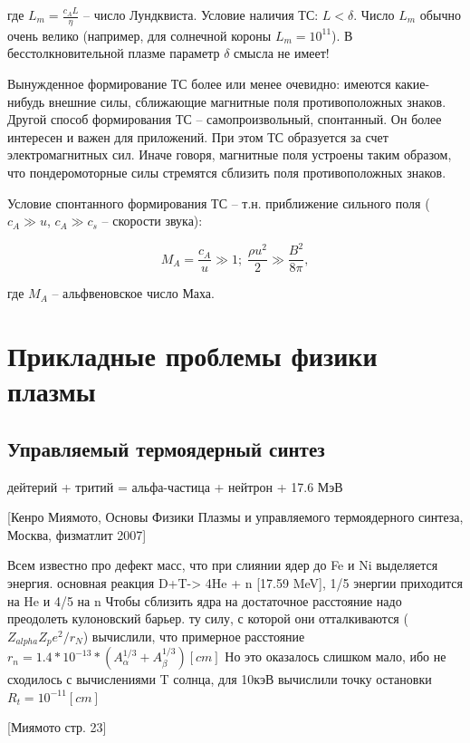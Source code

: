 \documentclass[10pt, a4paper]{article}
\let\stdsection\section
\renewcommand\section{\newpage\stdsection}
\begin{document}
где $L_m = \frac{c_AL}{\eta}$ -- число Лундквиста. Условие наличия ТС: $L<\delta$. Число $L_m$ обычно очень велико (например, для солнечной короны $L_m=10^{11}$). В бесстолкновительной плазме параметр $\delta$ смысла не имеет!

Вынужденное формирование ТС более или менее очевидно: имеются какие-нибудь внешние силы, сближающие магнитные поля противоположных знаков. Другой способ формирования ТС -- самопроизвольный, спонтанный. Он более интересен и важен для приложений. При этом ТС образуется за счет электромагнитных сил. Иначе говоря, магнитные поля устроены таким образом, что пондеромоторные силы стремятся сблизить поля противоположных знаков.

Условие спонтанного формирования ТС -- т.н. приближение сильного поля ($c_A \gg u$, $c_A \gg c_s$ -- скорости звука):

\begin{equation*}
	M_A = \frac{c_A}{u} \gg 1;\;\frac{\rho u^2}{2} \gg \frac{B^2}{8\pi},
\end{equation*}

где $M_A$ -- альфвеновское число Маха.

\section{Прикладные проблемы физики плазмы}

\subsection{Управляемый термоядерный синтез}

дейтерий + тритий = альфа-частица + нейтрон + 17.6 МэВ

[Кенро Миямото, Основы Физики Плазмы и управляемого термоядерного синтеза, Москва, физматлит 2007]

Всем известно про дефект масс, что при слиянии ядер до Fe и Ni выделяется энергия.
основная реакция D+T-> 4He + n [17.59 MeV], 1/5 энергии приходится на He и 4/5 на n
Чтобы сблизить ядра на достаточное расстояние надо преодолеть кулоновский барьер. ту силу, с которой они отталкиваются ($Z_{alpha}Z_p e^2/r_N$) вычислили, что примерное расстояние $r_{n}=1.4*10^{-13}*(A^{1/3}_{\alpha}+A^{1/3}_{\beta}) [cm]$ Но это оказалось слишком мало, ибо не сходилось с вычислениями T солнца, для 10кэВ вычислили точку остановки $R_t=10^{-11} [cm]$

[Миямото стр. 23]
\end{document}
